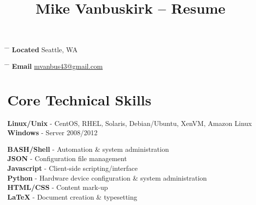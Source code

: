 \documentclass[10pt]{article} %
\begin{document}

\title{Mike Vanbuskirk -- Resume} %


\parbox{0.5\textwidth}{ %
\begin{tabbing} %
\hspace{3cm} \= \hspace{4cm} \= \kill %
{\bf Located} \> Seattle, WA\\ %
\end{tabbing}}
\hfill %
\parbox{0.5\textwidth}{ %
\begin{tabbing} %
\hspace{3cm} \= \hspace{4cm} \= \kill %
{\bf Email} \> \href{mailto:mvanbus43@gmail.com}{mvanbus43@gmail.com} \\ %
\end{tabbing}}


\section{Core Technical Skills}

{
\textbf{Linux/Unix} - CentOS, RHEL, Solaris, Debian/Ubuntu, XenVM, Amazon Linux\\
\textbf{Windows} - Server 2008/2012
}


{
\textbf{BASH/Shell} - Automation \& system administration\\
\textbf{JSON} - Configuration file management\\
\textbf{Javascript} - Client-side scripting/interface\\
\textbf{Python} - Hardware device configuration \& system administration\\
\textbf{HTML/CSS} - Content mark-up\\
\textbf{LaTeX} - Document creation \& typesetting
}
\end{document}

